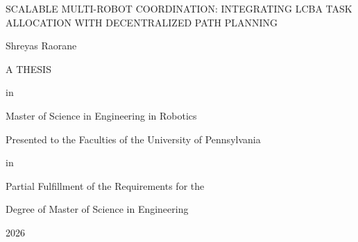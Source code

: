 \begin{titlepage}
  \singlespacing
  \centering
  \vspace*{0.4in}

  {\normalsize
    \MakeUppercase{Scalable Multi-Robot Coordination: Integrating LCBA Task
    Allocation with Decentralized Path Planning}
  \par}

  \vspace{0.25in}

  {\normalsize Shreyas Raorane\par}

  \vspace{0.45in}

  {\normalsize A THESIS\par}

  \vspace{0.12in}

  {\normalsize in\par}

  \vspace{0.12in}

  {\normalsize Master of Science in Engineering in Robotics\par}

  \vspace{0.3in}

  {\normalsize Presented to the Faculties of the University of Pennsylvania\par}

  \vspace{0.12in}

  {\normalsize in\par}

  \vspace{0.12in}

  {\normalsize Partial Fulfillment of the Requirements for the\par}

  \vspace{0.08in}

  {\normalsize Degree of Master of Science in Engineering\par}

  \vspace{0.08in}

  {\normalsize 2026\par}

  \vspace{0.35in}


\end{titlepage}
